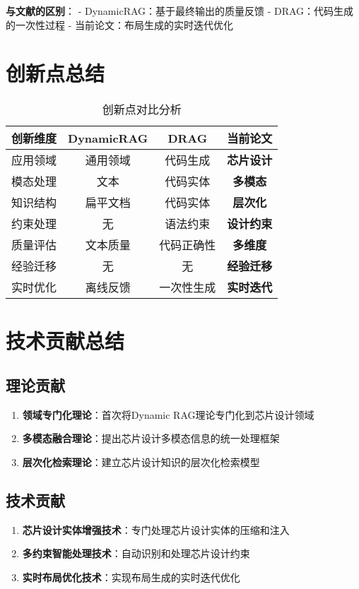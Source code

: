 \documentclass{ctexart}
\begin{document}
\textbf{与文献的区别}：
- DynamicRAG：基于最终输出的质量反馈
- DRAG：代码生成的一次性过程
- 当前论文：布局生成的实时迭代优化

\section{创新点总结}

\begin{table}[h]
\centering
\caption{创新点对比分析}
\begin{tabular}{lccc}
\toprule
创新维度 & DynamicRAG & DRAG & 当前论文 \\
\midrule
应用领域 & 通用领域 & 代码生成 & \textbf{芯片设计} \\
模态处理 & 文本 & 代码实体 & \textbf{多模态} \\
知识结构 & 扁平文档 & 代码实体 & \textbf{层次化} \\
约束处理 & 无 & 语法约束 & \textbf{设计约束} \\
质量评估 & 文本质量 & 代码正确性 & \textbf{多维度} \\
经验迁移 & 无 & 无 & \textbf{经验迁移} \\
实时优化 & 离线反馈 & 一次性生成 & \textbf{实时迭代} \\
\bottomrule
\end{tabular}
\label{tab:innovation_comparison}
\end{table}

\section{技术贡献总结}

\subsection{理论贡献}
\begin{enumerate}
    \item \textbf{领域专门化理论}：首次将Dynamic RAG理论专门化到芯片设计领域
    \item \textbf{多模态融合理论}：提出芯片设计多模态信息的统一处理框架
    \item \textbf{层次化检索理论}：建立芯片设计知识的层次化检索模型
\end{enumerate}

\subsection{技术贡献}
\begin{enumerate}
    \item \textbf{芯片设计实体增强技术}：专门处理芯片设计实体的压缩和注入
    \item \textbf{多约束智能处理技术}：自动识别和处理芯片设计约束
    \item \textbf{实时布局优化技术}：实现布局生成的实时迭代优化
\end{enumerate}
\end{document}
